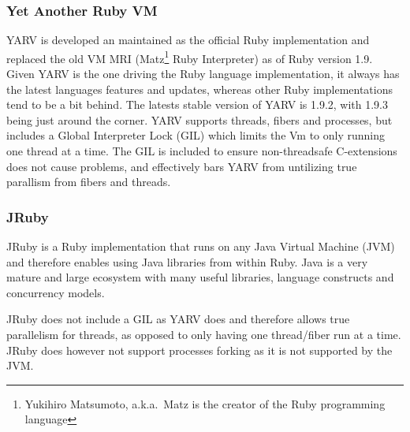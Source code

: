 \subsubsection{Yet Another Ruby VM}
YARV is developed an maintained as the official Ruby implementation and replaced
the old VM MRI (Matz\footnote{Yukihiro Matsumoto, a.k.a.\ Matz is the creator of 
the Ruby programming language} Ruby Interpreter) as of Ruby version 1.9. Given
YARV is the one driving the Ruby language implementation, it always has the
latest languages features and updates, whereas other Ruby implementations tend
to be a bit behind. The latests stable version of YARV is 1.9.2, with 1.9.3
being just around the corner. YARV supports threads, fibers and processes, but
includes a Global Interpreter Lock (GIL) which limits the Vm to only running
one thread at a time. The GIL is included to ensure non-threadsafe
C-extensions does not cause problems, and effectively bars YARV from
untilizing true parallism from fibers and threads.

\subsubsection{JRuby}
JRuby is a Ruby implementation that runs on any Java Virtual Machine (JVM)
and therefore enables using Java libraries from within Ruby. Java is a very
mature and large ecosystem with many useful libraries, language constructs and
concurrency models.

JRuby does not include a GIL as YARV does and therefore allows true
parallelism for threads, as opposed to only having one thread/fiber run
at a time. JRuby does however not support processes forking as it is not
supported by the JVM\@.

